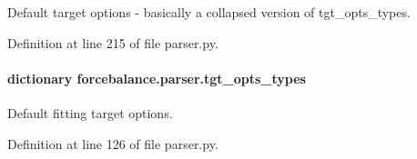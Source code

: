 Default target options -\/ basically a collapsed version of tgt\-\_\-opts\-\_\-types. 



Definition at line 215 of file parser.\-py.

\hypertarget{namespaceforcebalance_1_1parser_a95436b7fb9e99bd7b9f0a040b15fbe3a}{
\paragraph[{tgt\-\_\-opts\-\_\-types}]{\setlength{\rightskip}{0pt plus 5cm}dictionary forcebalance.\-parser.\-tgt\-\_\-opts\-\_\-types}}\label{namespaceforcebalance_1_1parser_a95436b7fb9e99bd7b9f0a040b15fbe3a}


Default fitting target options. 



Definition at line 126 of file parser.\-py.

